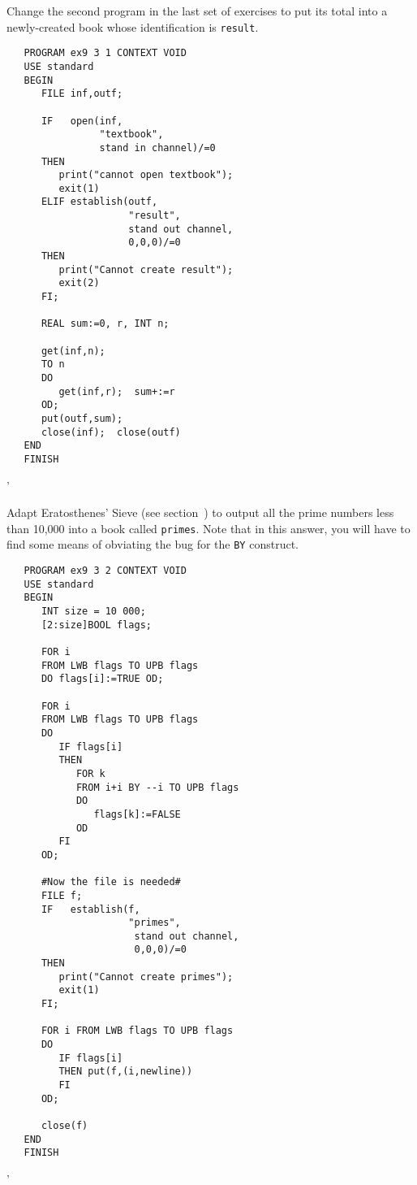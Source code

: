 \begin{exercise}
\item Change the second program in the last set of exercises to put its
total into a newly-created book whose identification is
\verb|result|. \ans \ %
\begin{verbatim}
   PROGRAM ex9 3 1 CONTEXT VOID
   USE standard
   BEGIN
      FILE inf,outf;

      IF   open(inf,
                "textbook",
                stand in channel)/=0
      THEN
         print("cannot open textbook");
         exit(1)
      ELIF establish(outf,
                     "result",
                     stand out channel,
                     0,0,0)/=0
      THEN
         print("Cannot create result");
         exit(2)
      FI;

      REAL sum:=0, r, INT n;

      get(inf,n);
      TO n
      DO
         get(inf,r);  sum+:=r
      OD;
      put(outf,sum);
      close(inf);  close(outf)
   END
   FINISH
\end{verbatim}
'
\item Adapt Eratosthenes' Sieve (see section~) to
out\-put all the prime numbers less than 10,000 into a book called
\verb|primes|. \ans Note that in this answer, you will have to find
some means of obviating the  bug
for the \verb|BY| construct.
\begin{verbatim}
   PROGRAM ex9 3 2 CONTEXT VOID
   USE standard
   BEGIN
      INT size = 10 000;
      [2:size]BOOL flags;

      FOR i
      FROM LWB flags TO UPB flags
      DO flags[i]:=TRUE OD;

      FOR i
      FROM LWB flags TO UPB flags
      DO
         IF flags[i]
         THEN
            FOR k
            FROM i+i BY --i TO UPB flags
            DO
               flags[k]:=FALSE
            OD
         FI
      OD;

      #Now the file is needed#
      FILE f;
      IF   establish(f,
                     "primes",
                      stand out channel,
                      0,0,0)/=0
      THEN
         print("Cannot create primes");
         exit(1)
      FI;

      FOR i FROM LWB flags TO UPB flags
      DO
         IF flags[i]
         THEN put(f,(i,newline))
         FI
      OD;

      close(f)
   END
   FINISH
\end{verbatim}
'
\end{exercise}

